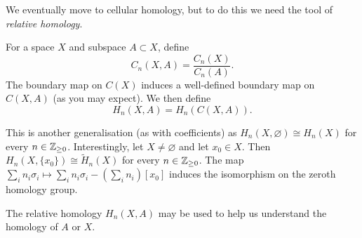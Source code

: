 We eventually move to cellular homology, but to do this we need the tool of \emph{relative homology}.

\begin{definition}
  For a space $X$ and subspace $A \subset X$, define
  \[C_n(X,A) = \frac{C_n(X)}{C_n(A)}. \]
  The boundary map on $C(X)$ induces a well-defined boundary map on $C(X,A)$ (as you may expect). We then define
  \[H_n(X,A) = H_n(C(X,A)).\]
\end{definition}

This is another generalisation (as with coefficients) as $H_n(X, \varnothing) \cong H_n(X)$ for every $n \in \mathbb{Z}_{\geq 0}$. Interestingly, let $X \neq \varnothing$ and let $x_0 \in X$. Then $H_n(X, \{x_0\}) \cong \tilde H_n(X)$ for every $n \in \mathbb{Z}_{\geq 0}$. The map $\sum_i n_i \sigma_i \mapsto \sum_i n_i \sigma_i - (\sum_i n_i)[x_0]$ induces the isomorphism on the zeroth homology group.

The relative homology $H_n(X,A)$ may be used to help us understand the homology of $A$ or $X$.

